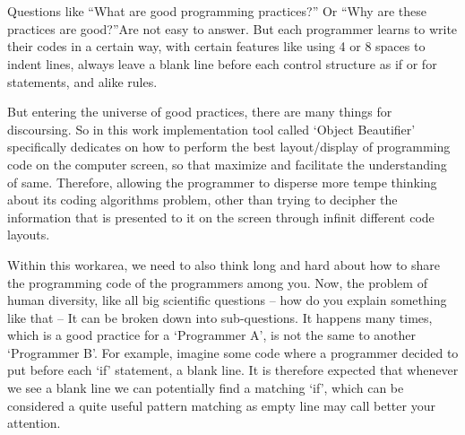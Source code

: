 

%
\cleardoublepage
{}


\chapter{}


\chooselang
{
    Questions like ``What are good programming practices?'' Or ``Why are these
    practices are good?''Are not easy to answer. But each programmer learns to
    write their codes in a certain way, with certain features like using 4 or 8
    spaces to indent lines, always leave a blank line before each control
    structure as if or for statements, and alike rules.
    \cite{industrialApplication}

    But entering the universe of good practices, there are many things for
    discoursing. So in this work implementation tool called `Object Beautifier'
    specifically dedicates on how to perform the best layout/display of
    programming code on the computer screen, so that maximize and facilitate the
    understanding of same. Therefore, allowing the programmer to disperse more
    tempe thinking about its coding algorithms problem, other than trying to
    decipher the information that is presented to it on the screen through
    infinit different code layouts. \cite{programIndentation}

    Within this work\s area, we need to also think long and hard about how to
    share the programming code of the programmers among you. Now, the problem of
    human diversity, like all big scientific questions -- how do you explain
    something like that -- It can be broken down into sub-questions. It happens
    many times, which is a good practice for a `Programmer A', is not the same
    to another `Programmer B'. For example, imagine some code where a programmer
    decided to put before each `if' statement, a blank line. It is therefore
    expected that whenever we see a blank line we can potentially find a
    matching `if', which can be considered a quite useful pattern matching as
    empty line may call better your attention. \cite{independentFramework}

}
